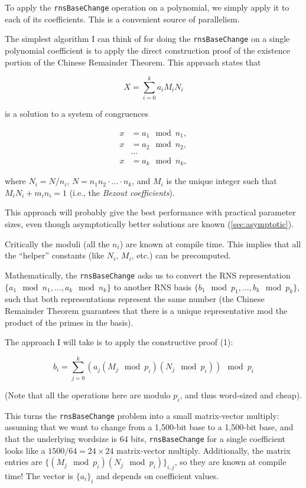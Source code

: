 To apply the \verb!rnsBaseChange! operation on a polynomial, we simply apply it to
each of its coefficients. This is a convenient source of parallelism.

The simplest algorithm I can think of for doing the \verb!rnsBaseChange! on a
single polynomial coefficient is to apply the direct construction proof of the
existence portion of the Chinese Remainder Theorem\cite{gauss1966english}.
This approach states that

\begin{equation*}
X = \sum_{i=0}^k a_i M_i N_i
\end{equation*}

is a solution to a system of congruences

\begin{align*}
    x &= a_1 \mod n_1, \\
    x &= a_2 \mod n_2, \\
      &... \\
    x &= a_k \mod n_k,
\end{align*}

where $N_i = N/n_i$, $N=n_1n_2\cdot...\cdot n_k$, and $M_i$ is the unique integer
such that $M_iN_i + m_in_i = 1$ (i.e., the \emph{Bezout coefficients}).

This approach will probably give the best performance with practical parameter
sizes, even though asymptotically better solutions are known (\autoref{sec:asymptotic}).

Critically the moduli (all the $n_i$) are known at compile time. This implies
that all the “helper” constants (like $N_i$, $M_i$, etc.) can be precomputed.

Mathematically, the \verb!rnsBaseChange! asks us to convert the RNS representation
$\{a_1 \mod n_1, …, a_k \mod n_k\}$ to another RNS basis $\{b_1 \mod p_1, …, b_k
\mod p_k\}$, such that both representations represent the same number (the
Chinese Remainder Theorem guarantees that there is a unique representative mod
the product of the primes in the basis).

The approach I will take is to apply the constructive proof (1):

\begin{equation*}
b_i = \sum_{j=0}^k (a_j (M_j \mod p_i) (N_j \mod p_i)) \mod p_i
\end{equation*}

(Note that all the operations here are modulo $p_i$, and thus word-sized and
cheap).

This turns the \verb!rnsBaseChange! problem into a small matrix-vector multiply:
assuming that we want to change from a 1,500-bit base to a 1,500-bit base, and
that the underlying wordsize is 64 bits, \verb!rnsBaseChange! for a single coefficient
looks like a $1500/64=24\times 24$ matrix-vector multiply.
Additionally, the matrix entries are $\{(M_j \mod p_i) (N_j \mod p_i)\}_{i,
j}$, so they are known at compile time!
The vector is $\{a_i\}_i$ and depends on coefficient values.

